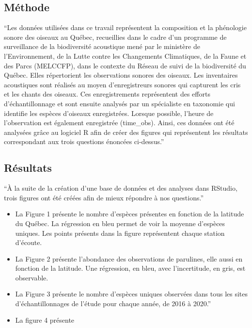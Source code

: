 \documentclass[
]{article}
\begin{document}
\hypertarget{muxe9thode}{%
\subsection{Méthode}\label{muxe9thode}}

``Les données utilisées dans ce travail représentent la composition et
la phénologie sonore des oiseaux au Québec, recueillies dans le cadre
d'un programme de surveillance de la biodiversité acoustique mené par le
ministère de l'Environnement, de la Lutte contre les Changements
Climatiques, de la Faune et des Parcs (MELCCFP), dans le contexte du
Réseau de suivi de la biodiversité du Québec. Elles répertorient les
observations sonores des oiseaux. Les inventaires acoustiques sont
réalisés au moyen d'enregistreurs sonores qui capturent les cris et les
chants des oiseaux. Ces enregistrements représentent des efforts
d'échantillonnage et sont ensuite analysés par un spécialiste en
taxonomie qui identifie les espèces d'oiseaux enregistrées. Lorsque
possible, l'heure de l'observation est également enregistrée
(time\_obs). Ainsi, ces données ont été analysées grâce au logiciel R
afin de créer des figures qui représentent les résultats correspondant
aux trois questions énoncées ci-dessus.''

\hypertarget{ruxe9sultats}{%
\subsection{Résultats}\label{ruxe9sultats}}

``À la suite de la création d'une base de données et des analyses dans
RStudio, trois figures ont été créées afin de mieux répondre à nos
questions.''

\begin{itemize}
\item
  La Figure 1 présente le nombre d'espèces présentes en fonction de la
  latitude du Québec. La régression en bleu permet de voir la moyenne
  d'espèces uniques. Les points présents dans la figure représentent
  chaque station d'écoute.
\item
  La Figure 2 présente l'abondance des observations de parulines, elle
  aussi en fonction de la latitude. Une régression, en bleu, avec
  l'incertitude, en gris, est observable.
\item
  La Figure 3 présente le nombre d'espèces uniques observées dans tous
  les sites d'échantillonnages de l'étude pour chaque année, de 2016 à
  2020.''
\item
  La figure 4 présente
\end{itemize}
\end{document}
